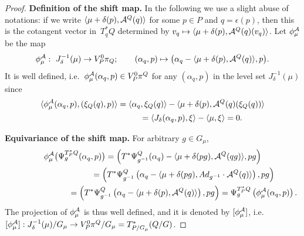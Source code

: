\documentclass[11pt]{article}
\newcommand{\A}{{\cal A}}
\newcommand{\e}{\epsilon}
\begin{document}
\begin{proof}
{\bf Def\/inition of the shift map.} In the following we use a slight abuse of notations: if we write $\langle \mu+\delta(p),\A^Q(q)\rangle$ for some $p\in P$ and $q=\e(p)$, then this is the cotangent vector in~$T_q^*Q$ determined by $v_q\mapsto \langle \mu+\delta(p),\A^Q(q)(v_q)\rangle$. Let $\phi_\mu^{\A}$ be the map
\[\phi_\mu^\A:\ J_\delta^{-1}(\mu) \to V^0_P\pi_Q; \qquad (\alpha_q,p) \mapsto \big(\alpha_q-\langle \mu+\delta(p),\A^Q(q)\rangle,p\big).\] It is well def\/ined, i.e.\ $\phi^\A_\mu(\alpha_q,p)\in V^0_P\pi^Q$ for any $(\alpha_q,p)$ in the level set $J_\delta^{-1}(\mu)$ since
\begin{gather*}
\langle \phi_\mu^{\A}(\alpha_q,p),(\xi_Q(q),p)\rangle   = \langle \alpha_q, \xi_Q(q)\rangle - \langle \mu+\delta(p),\A^Q(q)(\xi_Q(q))\rangle \\
 \phantom{\langle \phi_\mu^{\A}(\alpha_q,p),(\xi_Q(q),p)\rangle}= \langle J_\delta(\alpha_q,p),\xi\rangle - \langle \mu,\xi\rangle =0.
 \end{gather*}

{\bf Equivariance of the shift map.} For arbitrary $g\in G_\mu$, \begin{gather*}
\phi_\mu^{\A}\big(\Psi^{T_P^*Q}_g(\alpha_q,p)\big)  = \left(T^*\Psi^{Q}_{g^{-1}}(\alpha_q) - \langle \mu+\delta(pg) , \A^Q (qg) \rangle ,pg\right)\\
\phantom{\phi_\mu^{\A}(\Psi^{T_P^*Q}_g(\alpha_q,p))}{}
=  \left(T^*\Psi^{Q}_{g^{-1}}\left(\alpha_q - \langle \mu+\delta(pg) , {\rm Ad}_{g^{-1}}\cdot \A^Q(q)\rangle\right),pg\right)\\
\phantom{\phi_\mu^{\A}(\Psi^{T_P^*Q}_g(\alpha_q,p))}{}
= \left( T^*\Psi^{Q}_{g^{-1}}\left(\alpha_q - \langle \mu+\delta(p),\A^Q(q)\rangle\right),pg\right) = \Psi^{T_P^*Q}_g\left(\phi^\A_\mu(\alpha_q,p)\right).
\end{gather*}The projection of $\phi_\mu^{\A}$ is thus well def\/ined, and it is denoted by $[\phi_\mu^\A]$, i.e.\ $[\phi_\mu^\A]:J^{-1}_\delta(\mu)/G_\mu \to V^0_P \pi^Q/G_\mu=T^*_{P/G_\mu}(Q/G)$.
 \end{proof}
\end{document}
